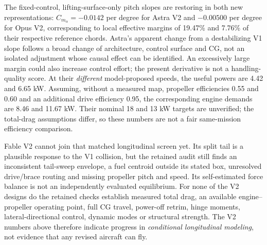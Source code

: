 \documentclass[11pt,a4paper]{article}
\begin{document}
The fixed-control, lifting-surface-only pitch slopes are restoring in both new representations: $C_{m_\alpha}=-0.0142$ per degree for Astra V2 and $-0.00500$ per degree for Opus V2, corresponding to local effective margins of 19.47\% and 7.76\% of their respective reference chords. Astra's apparent change from a destabilizing V1 slope follows a broad change of architecture, control surface and CG, not an isolated adjustment whose causal effect can be identified. An excessively large margin could also increase control effort; the present derivative is not a handling-quality score. At their \emph{different} model-proposed speeds, the useful powers are 4.42 and 6.65 kW. Assuming, without a measured map, propeller efficiencies 0.55 and 0.60 and an additional drive efficiency 0.95, the corresponding engine demands are 8.46 and 11.67 kW. Their nominal 18 and 13 kW targets are unverified; the total-drag assumptions differ, so these numbers are not a fair same-mission efficiency comparison.

Fable V2 cannot join that matched longitudinal screen yet. Its split tail is a plausible response to the V1 collision, but the retained audit still finds an inconsistent tail-sweep envelope, a fuel centroid outside its stated box, unresolved drive/brace routing and missing propeller pitch and speed. Its self-estimated force balance is not an independently evaluated equilibrium. For none of the V2 designs do the retained checks establish measured total drag, an available engine--propeller operating point, full CG travel, power-off retrim, hinge moments, lateral-directional control, dynamic modes or structural strength. The V2 numbers above therefore indicate progress in \emph{conditional longitudinal modeling}, not evidence that any revised aircraft can fly.
\end{document}
